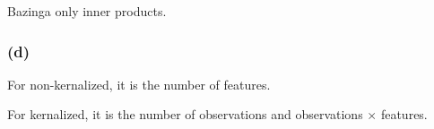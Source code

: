 \documentclass[letterpaper,10pt]{article} %
\begin{document}
Bazinga only inner products.
\subsubsection*{(d)}
For non-kernalized, it is the number of features.

For kernalized, it is the number of observations and observations $\times$ features.
%
%

\end{document}
